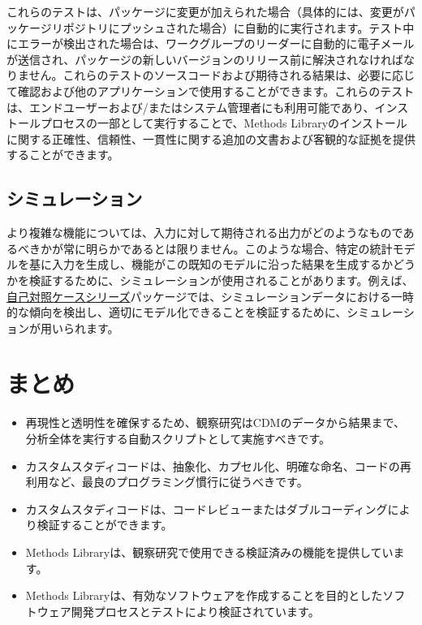 \documentclass[
  11pt]{book}
\makeatletter
\providecommand{\tightlist}{%
  \setlength{\itemsep}{0pt}\setlength{\parskip}{0pt}}
\newenvironment{kframe}{%
\medskip{}
\setlength{\fboxsep}{.8em}
 \def\at@end@of@kframe{}%
 \ifinner\ifhmode%
  \def\at@end@of@kframe{\end{minipage}}%
  \begin{minipage}{\columnwidth}%
 \fi\fi%
 \def\FrameCommand##1{\hskip\@totalleftmargin \hskip-\fboxsep
 \colorbox{myShadeColor}{##1}\hskip-\fboxsep
     \hskip-\linewidth \hskip-\@totalleftmargin \hskip\columnwidth}%
 \MakeFramed {\advance\hsize-\width
   \@totalleftmargin\z@ \linewidth\hsize
   \@setminipage}}%
 {\par\unskip\endMakeFramed%
 \at@end@of@kframe}
\newenvironment{rmdblock}[1]
  {
  \begin{itemize}
  \renewcommand{\labelitemi}{
    \raisebox{-.7\height}[0pt][0pt]{
      {\setkeys{Gin}{width=3em,keepaspectratio}\texttt{[image: images/\#1]}}
    }
  }
  \setlength{\fboxsep}{1em}
  \begin{kframe}
  \item
  }
  {
  \end{kframe}
  \end{itemize}
  }
\newenvironment{rmdsummary}
  {\begin{rmdblock}{summary}}
  {\end{rmdblock}}
\theoremstyle{definition}
\theoremstyle{definition}
\theoremstyle{definition}
\theoremstyle{definition}
\theoremstyle{remark}
\makeatother
\begin{document}
これらのテストは、パッケージに変更が加えられた場合（具体的には、変更がパッケージリポジトリにプッシュされた場合）に自動的に実行されます。テスト中にエラーが検出された場合は、ワークグループのリーダーに自動的に電子メールが送信され、パッケージの新しいバージョンのリリース前に解決されなければなりません。これらのテストのソースコードおよび期待される結果は、必要に応じて確認および他のアプリケーションで使用することができます。これらのテストは、エンドユーザーおよび/またはシステム管理者にも利用可能であり、インストールプロセスの一部として実行することで、Methods Libraryのインストールに関する正確性、信頼性、一貫性に関する追加の文書および客観的な証拠を提供することができます。

\subsection{シミュレーション}\label{ux30b7ux30dfux30e5ux30ecux30fcux30b7ux30e7ux30f3}

より複雑な機能については、入力に対して期待される出力がどのようなものであるべきかが常に明らかであるとは限りません。このような場合、特定の統計モデルを基に入力を生成し、機能がこの既知のモデルに沿った結果を生成するかどうかを検証するために、シミュレーションが使用されることがあります。例えば、\href{https://ohdsi.github.io/SelfControlledCaseSeries/}{自己対照ケースシリーズ}パッケージでは、シミュレーションデータにおける一時的な傾向を検出し、適切にモデル化できることを検証するために、シミュレーションが用いられます。

\section{まとめ}\label{ux307eux3068ux3081-14}

\begin{rmdsummary}
\begin{itemize}
\tightlist
\item
  再現性と透明性を確保するため、観察研究はCDMのデータから結果まで、分析全体を実行する自動スクリプトとして実施すべきです。
\item
  カスタムスタディコードは、抽象化、カプセル化、明確な命名、コードの再利用など、最良のプログラミング慣行に従うべきです。
\item
  カスタムスタディコードは、コードレビューまたはダブルコーディングにより検証することができます。
\item
  Methods Libraryは、観察研究で使用できる検証済みの機能を提供しています。
\item
  Methods Libraryは、有効なソフトウェアを作成することを目的としたソフトウェア開発プロセスとテストにより検証されています。
\end{itemize}
\end{rmdsummary}
\end{document}
